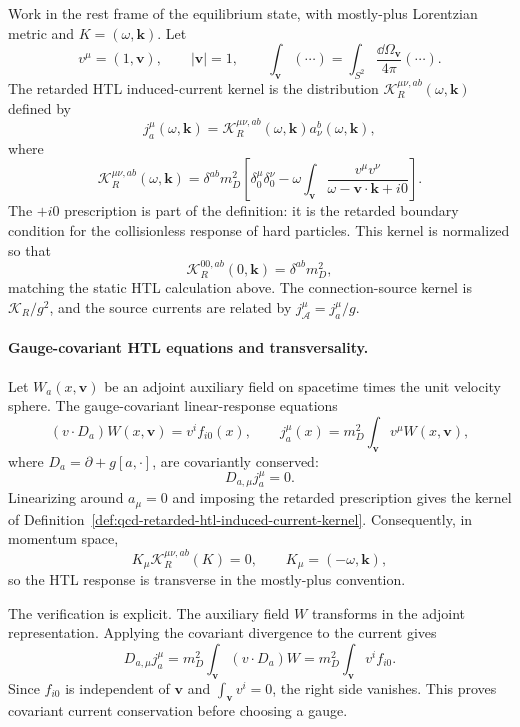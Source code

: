 \begin{definition}
\label{def:qcd-retarded-htl-induced-current-kernel}
Work in the rest frame of the equilibrium state, with mostly-plus Lorentzian
metric and \(K=(\omega,\mathbf k)\).  Let
\[
  v^\mu=(1,\mathbf v),\qquad |\mathbf v|=1,\qquad
  \int_{\mathbf v}(\cdots)
  =
  \int_{S^2}\frac{\dd\Omega_{\mathbf v}}{4\pi}(\cdots).
\]
The retarded HTL induced-current kernel is the distribution
\(\mathcal K_R^{\mu\nu,ab}(\omega,\mathbf k)\) defined by
\[
  j_a^\mu(\omega,\mathbf k)
  =
  \mathcal K_R^{\mu\nu,ab}(\omega,\mathbf k)a_\nu^b(\omega,\mathbf k),
\]
where
\[
  \mathcal K_R^{\mu\nu,ab}(\omega,\mathbf k)
  =
  \delta^{ab}m_D^2
  \left[
    \delta^\mu_0\delta^\nu_0
    -
    \omega\int_{\mathbf v}
    \frac{v^\mu v^\nu}
    {\omega-\mathbf v\cdot\mathbf k+i0}
  \right].
\]
The \(+i0\) prescription is part of the definition: it is the retarded
boundary condition for the collisionless response of hard particles.  This
kernel is normalized so that
\[
  \mathcal K_R^{00,ab}(0,\mathbf k)=\delta^{ab}m_D^2,
\]
matching the static HTL calculation above.
The connection-source kernel is \(\mathcal K_R/g^2\), and the source currents
are related by \(j_{\mathcal A}^\mu=j_a^\mu/g\).
\end{definition}

\paragraph{Gauge-covariant HTL equations and transversality.}
Let \(W_a(x,\mathbf v)\) be an adjoint auxiliary field on spacetime times the
unit velocity sphere.  The gauge-covariant linear-response equations
\[
  (v\cdot D_a)W(x,\mathbf v)=v^if_{i0}(x),\qquad
  j_a^\mu(x)=m_D^2\int_{\mathbf v}v^\mu W(x,\mathbf v),
\]
where \(D_a=\partial+g[a,\cdot]\), are covariantly conserved:
\[
  D_{a,\mu}j_a^\mu=0.
\]
Linearizing around \(a_\mu=0\) and imposing the retarded prescription gives
the kernel of Definition~\ref{def:qcd-retarded-htl-induced-current-kernel}.
Consequently, in momentum space,
\[
  K_\mu\mathcal K_R^{\mu\nu,ab}(K)=0,
  \qquad
  K_\mu=(-\omega,\mathbf k),
\]
so the HTL response is transverse in the mostly-plus convention.

The verification is explicit.
The auxiliary field \(W\) transforms in the adjoint representation.  Applying
the covariant divergence to the current gives
\[
  D_{a,\mu}j_a^\mu
  =
  m_D^2\int_{\mathbf v}(v\cdot D_a)W
  =
  m_D^2\int_{\mathbf v}v^if_{i0}.
\]
Since \(f_{i0}\) is independent of \(\mathbf v\) and
\(\int_{\mathbf v}v^i=0\), the right side vanishes.  This proves covariant
current conservation before choosing a gauge.

